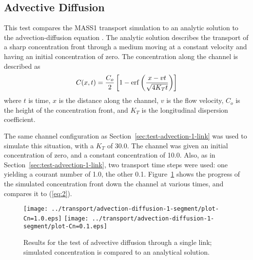\documentclass[12pt,dvips,letterpaper]{article}
\begin{document}


\subsection{Advective Diffusion}
\label{sec:test-advection-diffusion-1-link}

This test compares the MASS1 transport simulation to an analytic
solution to the advection-diffusion equation \citep[][\S~2.4]{Fis79}.
The analytic solution describes the transport of a sharp concentration
front through a medium moving at a constant velocity and having an
initial concentration of zero.  The concentration along the channel is
described as
\begin{equation}
  \label{eq:2}
  C(x,t) = { { C_{o} } \over 2 } \left[ { 1 - \mathrm{erf} \left( { { x - vt } 
          \over { \sqrt{4 K_{T} t} } } \right) } \right]
\end{equation}
where $t$ is time, $x$ is the distance along the channel, $v$ is the
flow velocity, $C_{o}$ is the height of the concentration front, and
$K_{T}$ is the longitudinal dispersion coefficient.  

The same channel configuration as
Section~\ref{sec:test-advection-1-link} was used to simulate this
situation, with a $K_{T}$ of 30.0.  The channel was given an initial
concentration of zero, and a constant concentration of 10.0. Also, as
in Section~\ref{sec:test-advection-1-link}, two transport time steps
were used: one yielding a courant number of 1.0, the other 0.1.
Figure~\ref{fig:test-advection-diffusion-1-results} shows the progress
of the simulated concentration front down the channel at various
times, and compares it to (\ref{eq:2}).


\begin{figure}[htbp]
  \begin{center}
    \texttt{[image: ../transport/advection-diffusion-1-segment/plot-Cn=1.0.eps]}
    \texttt{[image: ../transport/advection-diffusion-1-segment/plot-Cn=0.1.eps]}
    \caption{Results for the test of advective diffusion through a single link;
      simulated concentration is compared to an analytical solution.}
    \label{fig:test-advection-diffusion-1-results}
  \end{center}
\end{figure}


\end{document}
